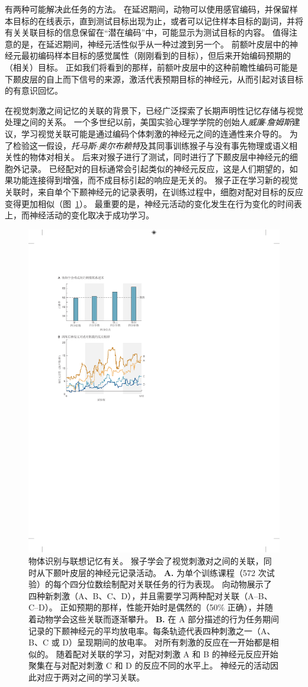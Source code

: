 有两种可能解决此任务的方法。
在延迟期间，动物可以使用感官编码，并保留样本目标的在线表示，直到测试目标出现为止，或者可以记住样本目标的副词，并将有关关联目标的信息保留在“潜在编码”中，可能显示为测试目标的内容。
值得注意的是，在延迟期间，神经元活性似乎从一种过渡到另一个。
前额叶皮层中的神经元最初编码样本目标的感觉属性（刚刚看到的目标），但后来开始编码预期的（相关）目标。 
正如我们将看到的那样，前额叶皮层中的这种前瞻性编码可能是下颞皮层的自上而下信号的来源，激活代表预期目标的神经元，从而引起对该目标的有意识回忆。


在视觉刺激之间记忆的关联的背景下，已经广泛探索了长期声明性记忆存储与视觉处理之间的关系。
一个多世纪以前，美国实验心理学学院的创始人\textit{威廉$\cdot$詹姆斯}建议，学习视觉关联可能是通过编码个体刺激的神经元之间的连通性来介导的。 为了检验这一假设，\textit{托马斯$\cdot$奥尔布赖特}及其同事训练猴子与没有事先物理或语义相关性的物体对相关。
后来对猴子进行了测试，同时进行了下颞皮层中神经元的细胞外记录。
已经配对的目标通常会引起类似的神经元反应，这是人们期望的，如果功能连接得到增强，而不成目标引起的响应是无关的。
猴子正在学习新的视觉关联时，来自单个下颞神经元的记录表明，在训练过程中，细胞对配对目标的反应变得更加相似（图~\ref{fig:24_12}）。
最重要的是，神经元活动的变化发生在行为变化的时间表上，而神经活动的变化取决于成功学习。


\begin{figure}[htbp]
	\centering
	\includegraphics[width=0.65\linewidth]{chap24/fig_24_12}
	\caption{物体识别与联想记忆有关。
		猴子学会了视觉刺激对之间的关联，同时从下颞叶皮层的神经元记录活动。
		\textbf{A.} 为单个训练课程（572 次试验）的每个四分位数绘制配对关联任务的行为表现。
		向动物展示了四种新刺激（A、B、C、D），并且需要学习两种配对关联（A–B、C–D）。
		正如预期的那样，性能开始时是偶然的（50\% 正确），并随着动物学会这些关联而逐渐攀升。
		\textbf{B.} 在 A 部分描述的行为任务期间记录的下颞神经元的平均放电率。每条轨迹代表四种刺激之一（A、B、C 或 D）呈现期间的放电率。
		对所有刺激的反应在一开始都是相似的。
		随着配对关联的学习，对配对刺激 A 和 B 的神经元反应开始聚集在与对配对刺激 C 和 D 的反应不同的水平上。
		神经元的活动因此对应于两对之间的学习关联。}
	\label{fig:24_12}
\end{figure}


